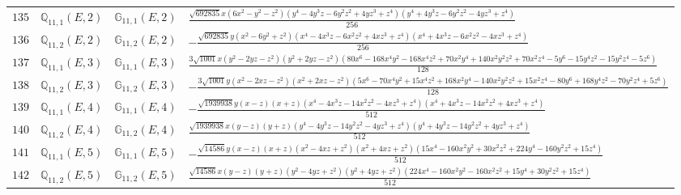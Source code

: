 \documentclass[fleqn,8pt,landscape]{jsarticle}
\begin{document}
\begin{table}[ht!]
\begin{center}
\begin{tabular}{cccl}
$ 135 $ & $ \mathbb{Q}_{11,1}(E,2) $ & $ \mathbb{G}_{11,1}(E,2) $ & $ \frac{\sqrt{692835} x \left(6 x^{2} - y^{2} - z^{2}\right) \left(y^{4} - 4 y^{3} z - 6 y^{2} z^{2} + 4 y z^{3} + z^{4}\right) \left(y^{4} + 4 y^{3} z - 6 y^{2} z^{2} - 4 y z^{3} + z^{4}\right)}{256} $ \\
$ 136 $ & $ \mathbb{Q}_{11,2}(E,2) $ & $ \mathbb{G}_{11,2}(E,2) $ & $ - \frac{\sqrt{692835} y \left(x^{2} - 6 y^{2} + z^{2}\right) \left(x^{4} - 4 x^{3} z - 6 x^{2} z^{2} + 4 x z^{3} + z^{4}\right) \left(x^{4} + 4 x^{3} z - 6 x^{2} z^{2} - 4 x z^{3} + z^{4}\right)}{256} $ \\
$ 137 $ & $ \mathbb{Q}_{11,1}(E,3) $ & $ \mathbb{G}_{11,1}(E,3) $ & $ \frac{3 \sqrt{1001} x \left(y^{2} - 2 y z - z^{2}\right) \left(y^{2} + 2 y z - z^{2}\right) \left(80 x^{6} - 168 x^{4} y^{2} - 168 x^{4} z^{2} + 70 x^{2} y^{4} + 140 x^{2} y^{2} z^{2} + 70 x^{2} z^{4} - 5 y^{6} - 15 y^{4} z^{2} - 15 y^{2} z^{4} - 5 z^{6}\right)}{128} $ \\
$ 138 $ & $ \mathbb{Q}_{11,2}(E,3) $ & $ \mathbb{G}_{11,2}(E,3) $ & $ - \frac{3 \sqrt{1001} y \left(x^{2} - 2 x z - z^{2}\right) \left(x^{2} + 2 x z - z^{2}\right) \left(5 x^{6} - 70 x^{4} y^{2} + 15 x^{4} z^{2} + 168 x^{2} y^{4} - 140 x^{2} y^{2} z^{2} + 15 x^{2} z^{4} - 80 y^{6} + 168 y^{4} z^{2} - 70 y^{2} z^{4} + 5 z^{6}\right)}{128} $ \\
$ 139 $ & $ \mathbb{Q}_{11,1}(E,4) $ & $ \mathbb{G}_{11,1}(E,4) $ & $ - \frac{\sqrt{1939938} y \left(x - z\right) \left(x + z\right) \left(x^{4} - 4 x^{3} z - 14 x^{2} z^{2} - 4 x z^{3} + z^{4}\right) \left(x^{4} + 4 x^{3} z - 14 x^{2} z^{2} + 4 x z^{3} + z^{4}\right)}{512} $ \\
$ 140 $ & $ \mathbb{Q}_{11,2}(E,4) $ & $ \mathbb{G}_{11,2}(E,4) $ & $ \frac{\sqrt{1939938} x \left(y - z\right) \left(y + z\right) \left(y^{4} - 4 y^{3} z - 14 y^{2} z^{2} - 4 y z^{3} + z^{4}\right) \left(y^{4} + 4 y^{3} z - 14 y^{2} z^{2} + 4 y z^{3} + z^{4}\right)}{512} $ \\
$ 141 $ & $ \mathbb{Q}_{11,1}(E,5) $ & $ \mathbb{G}_{11,1}(E,5) $ & $ - \frac{\sqrt{14586} y \left(x - z\right) \left(x + z\right) \left(x^{2} - 4 x z + z^{2}\right) \left(x^{2} + 4 x z + z^{2}\right) \left(15 x^{4} - 160 x^{2} y^{2} + 30 x^{2} z^{2} + 224 y^{4} - 160 y^{2} z^{2} + 15 z^{4}\right)}{512} $ \\
$ 142 $ & $ \mathbb{Q}_{11,2}(E,5) $ & $ \mathbb{G}_{11,2}(E,5) $ & $ \frac{\sqrt{14586} x \left(y - z\right) \left(y + z\right) \left(y^{2} - 4 y z + z^{2}\right) \left(y^{2} + 4 y z + z^{2}\right) \left(224 x^{4} - 160 x^{2} y^{2} - 160 x^{2} z^{2} + 15 y^{4} + 30 y^{2} z^{2} + 15 z^{4}\right)}{512} $ \\

\end{tabular}
\end{center}
\end{table}
\end{document}
